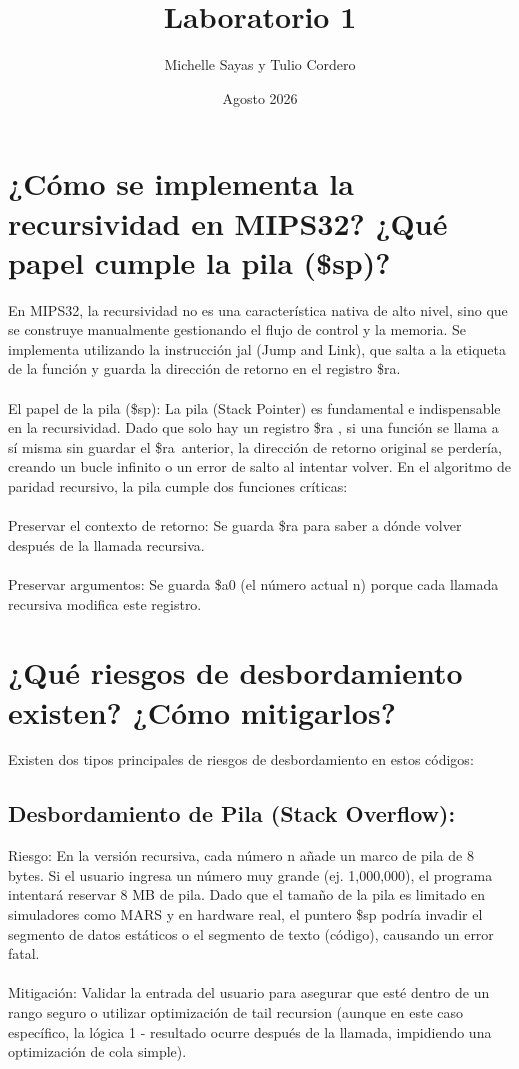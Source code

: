\documentclass{article}
\title{Laboratorio 1}
\author{Michelle Sayas y Tulio Cordero}
\date{Agosto 2026}
\begin{document}
\maketitle

\section{¿Cómo se implementa la recursividad en MIPS32? ¿Qué papel cumple la pila (\$sp)?}

En MIPS32, la recursividad no es una característica nativa de alto nivel, sino que se construye manualmente gestionando el flujo de control y la memoria. Se implementa utilizando la instrucción jal (Jump and Link), que salta a la etiqueta de la función y guarda la dirección de retorno en el registro \$ra.
\\
\\
El papel de la pila (\$sp): La pila (Stack Pointer) es fundamental e indispensable en la recursividad. Dado que solo hay un registro \$ra , si una función se llama a sí misma sin guardar el \$ra\ anterior, la dirección de retorno original se perdería, creando un bucle infinito o un error de salto al intentar volver.
En el algoritmo de paridad recursivo, la pila cumple dos funciones críticas:
\\
\\
Preservar el contexto de retorno: Se guarda \$ra para saber a dónde volver después de la llamada recursiva.
\\
\\
Preservar argumentos: Se guarda \$a0 (el número actual n) porque cada llamada recursiva modifica este registro.
\section{¿Qué riesgos de desbordamiento existen? ¿Cómo mitigarlos?}

Existen dos tipos principales de riesgos de desbordamiento en estos códigos:
\subsection{Desbordamiento de Pila (Stack Overflow):}
Riesgo: En la versión recursiva, cada número n añade un marco de pila de 8 bytes. Si el usuario ingresa un número muy grande (ej. 1,000,000), el programa intentará reservar 8 MB de pila. Dado que el tamaño de la pila es limitado en simuladores como MARS y en hardware real, el puntero \$sp podría invadir el segmento de datos estáticos o el segmento de texto (código), causando un error fatal.
\\
\\
Mitigación: Validar la entrada del usuario para asegurar que esté dentro de un rango seguro o utilizar optimización de tail recursion (aunque en este caso específico, la lógica 1 - resultado ocurre después de la llamada, impidiendo una optimización de cola simple).
\end{document}
